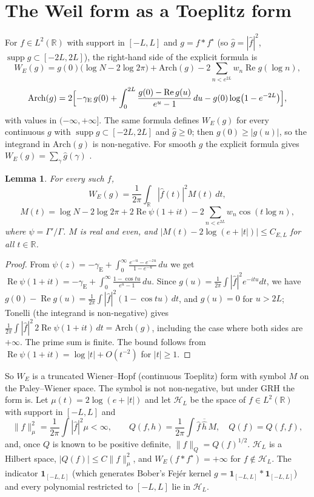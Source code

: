 \documentclass[11pt]{amsart}
\newtheorem{lemma}[theorem]{Lemma}
\theoremstyle{definition}
\theoremstyle{remark}
\newcommand{\R}{\mathbb{R}}
\newcommand{\Hs}{\mathcal{H}_L}
\DeclareMathOperator{\supp}{supp}
\begin{document}
\section{The Weil form as a Toeplitz form}

For $f\in L^2(\R)$ with support in $[-L,L]$ and $g=f*f^\star$ (so $\hat g=|\hat f|^2$, $\supp g\subset[-2L,2L]$),
the right-hand side of the explicit formula \cite[Sect.~2]{Hac} is
\[
  W_E(g)=g(0)\bigl(\log N-2\log2\pi\bigr)+\mathrm{Arch}(g)-2\sum_{n<e^{2L}}w_n\operatorname{Re}g(\log n),
\]
\[
  \mathrm{Arch}(g)=2\Bigl[-\gamma_{\mathrm E}\,g(0)+\int_0^{2L}\frac{g(0)-\operatorname{Re}g(u)}{e^u-1}\,du-g(0)\log\bigl(1-e^{-2L}\bigr)\Bigr],
\]
with values in $(-\infty,+\infty]$. The same formula defines $W_E(g)$ for every continuous $g$ with
$\supp g\subset[-2L,2L]$ and $\hat g\ge0$; then $g(0)\ge|g(u)|$, so the integrand in $\mathrm{Arch}(g)$ is non-negative.
For smooth $g$ the explicit formula gives $W_E(g)=\sum_\gamma\hat g(\gamma)$ \cite{Mestre,Bober}.

\begin{lemma}\label{lem:symbol}
For every such $f$,
\[
  W_E(g)=\frac1{2\pi}\int_\R|\hat f(t)|^2M(t)\,dt,
\]
\[
  M(t)=\log N-2\log2\pi+2\operatorname{Re}\psi(1+it)-2\sum_{n<e^{2L}}w_n\cos(t\log n),
\]
where $\psi=\Gamma'/\Gamma$. $M$ is real and even, and $|M(t)-2\log(e+|t|)|\le C_{E,L}$ for all $t\in\R$.
\end{lemma}

\begin{proof}
From $\psi(z)=-\gamma_{\mathrm E}+\int_0^\infty\frac{e^{-u}-e^{-zu}}{1-e^{-u}}\,du$ we get
$\operatorname{Re}\psi(1+it)=-\gamma_{\mathrm E}+\int_0^\infty\frac{1-\cos tu}{e^u-1}\,du$. Since
$g(u)=\frac1{2\pi}\int|\hat f|^2e^{-itu}dt$, we have $g(0)-\operatorname{Re}g(u)=\frac1{2\pi}\int|\hat f|^2(1-\cos tu)\,dt$, and
$g(u)=0$ for $u>2L$; Tonelli (the integrand is non-negative) gives
$\frac1{2\pi}\int|\hat f|^2\,2\operatorname{Re}\psi(1+it)\,dt=\mathrm{Arch}(g)$, including the case where both sides are $+\infty$.
The prime sum is finite. The bound follows from $\operatorname{Re}\psi(1+it)=\log|t|+O(t^{-2})$ for $|t|\ge1$.
\end{proof}

So $W_E$ is a truncated Wiener--Hopf (continuous Toeplitz) form with symbol $M$ on the Paley--Wiener space. The symbol is not non-negative, but under GRH
the form is. Let $\mu(t)=2\log(e+|t|)$ and let $\Hs$ be the space of $f\in L^2(\R)$ with support in $[-L,L]$ and
\[
  \|f\|_\mu^2=\frac1{2\pi}\int|\hat f|^2\mu<\infty,\qquad Q(f,h)=\frac1{2\pi}\int\hat f\,\overline{\hat h}\,M,\quad Q(f)=Q(f,f),
\]
and, once $Q$ is known to be positive definite, $\|f\|_Q=Q(f)^{1/2}$.
$\Hs$ is a Hilbert space, $|Q(f)|\le C\|f\|_\mu^2$, and $W_E(f*f^\star)=+\infty$ for $f\notin\Hs$. The indicator
$\mathbf 1_{[-L,L]}$ (which generates Bober's Fej\'er kernel $g=\mathbf 1_{[-L,L]}*\mathbf 1_{[-L,L]}$) and every polynomial restricted to $[-L,L]$ lie in $\Hs$.
\end{document}
